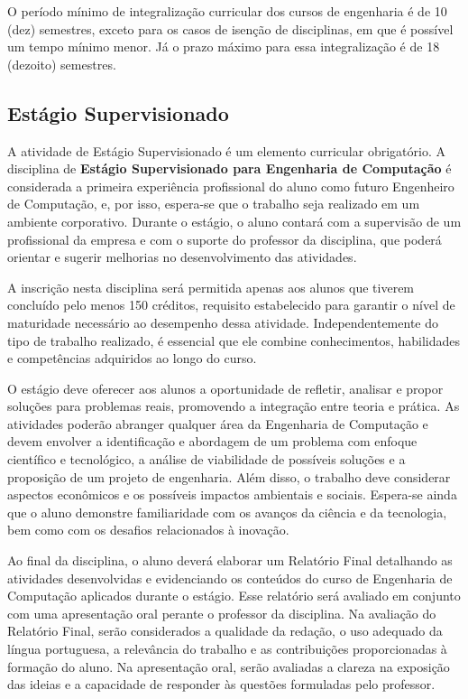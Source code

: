 O período mínimo de integralização curricular dos cursos de engenharia é de 10 (dez) semestres, exceto para os casos de isenção de disciplinas, em que é possível um tempo mínimo menor. Já o prazo máximo para essa integralização é de 18 (dezoito) semestres.


\subsection{Estágio Supervisionado}

A atividade de Estágio Supervisionado é um elemento curricular obrigatório. 
A disciplina de \textbf{Estágio Supervisionado para Engenharia de Computação} é considerada a primeira experiência profissional do aluno como futuro Engenheiro de Computação, e, por isso, espera-se que o trabalho seja realizado em um ambiente corporativo. Durante o estágio, o aluno contará com a supervisão de um profissional da empresa e com o suporte do professor da disciplina, que poderá orientar e sugerir melhorias no desenvolvimento das atividades.

A inscrição nesta disciplina será permitida apenas aos alunos que tiverem concluído pelo menos 150 créditos, requisito estabelecido para garantir o nível de maturidade necessário ao desempenho dessa atividade. Independentemente do tipo de trabalho realizado, é essencial que ele combine conhecimentos, habilidades e competências adquiridos ao longo do curso.

O estágio deve oferecer aos alunos a oportunidade de refletir, analisar e propor soluções para problemas reais, promovendo a integração entre teoria e prática. As atividades poderão abranger qualquer área da Engenharia de Computação e devem envolver a identificação e abordagem de um problema com enfoque científico e tecnológico, a análise de viabilidade de possíveis soluções e a proposição de um projeto de engenharia. Além disso, o trabalho deve considerar aspectos econômicos e os possíveis impactos ambientais e sociais. Espera-se ainda que o aluno demonstre familiaridade com os avanços da ciência e da tecnologia, bem como com os desafios relacionados à inovação.

Ao final da disciplina, o aluno deverá elaborar um Relatório Final detalhando as atividades desenvolvidas e evidenciando os conteúdos do curso de Engenharia de Computação aplicados durante o estágio. Esse relatório será avaliado em conjunto com uma apresentação oral perante o professor da disciplina. Na avaliação do Relatório Final, serão considerados a qualidade da redação, o uso adequado da língua portuguesa, a relevância do trabalho e as contribuições proporcionadas à formação do aluno. Na apresentação oral, serão avaliadas a clareza na exposição das ideias e a capacidade de responder às questões formuladas pelo professor.

